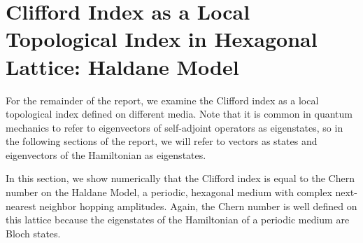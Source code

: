 \documentclass[a4paper]{article}
\begin{document}
\section{Clifford Index as a Local Topological Index in Hexagonal Lattice: Haldane Model}

For the remainder of the report, we examine the Clifford index as a local topological index defined on different media.
Note that it is common in quantum mechanics to refer to eigenvectors of self-adjoint operators as eigenstates, so in the following sections of the report, we will refer to vectors as states and eigenvectors of the Hamiltonian as eigenstates.

In this section, we show numerically that the Clifford index is equal to the Chern number on the Haldane Model, a periodic, hexagonal medium with complex next-nearest neighbor hopping amplitudes.
Again, the Chern number is well defined on this lattice because the eigenstates of the Hamiltonian of a periodic medium are Bloch states.
\end{document}
